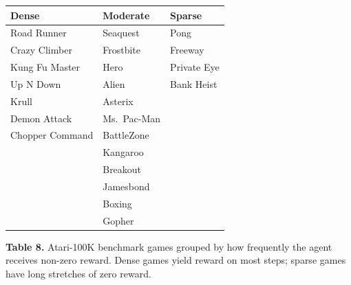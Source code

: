 \documentclass[11pt]{article}
\begin{document}
\vspace{0.3em}
\begin{table}[h]
\centering
\renewcommand{\arraystretch}{1.15}
\setlength{\tabcolsep}{14pt}
\begin{tabular}{l l l}
\toprule
\textbf{Dense} & \textbf{Moderate} & \textbf{Sparse} \\
\midrule
Road Runner     & Seaquest    & Pong        \\
Crazy Climber   & Frostbite   & Freeway     \\
Kung Fu Master  & Hero        & Private Eye \\
Up N Down       & Alien       & Bank Heist  \\
Krull           & Asterix     &             \\
Demon Attack    & Ms.\ Pac-Man &            \\
Chopper Command & BattleZone  &             \\
                & Kangaroo    &             \\
                & Breakout    &             \\
                & Jamesbond   &             \\
                & Boxing      &             \\
                & Gopher      &             \\
\bottomrule
\end{tabular}

\vspace{1.2em}
{\raggedright\small \textbf{Table 8.} Atari-100K benchmark games grouped by
how frequently the agent receives non-zero reward. Dense games yield
reward on most steps; sparse games have long stretches of zero reward.\par}
\end{table}
\end{document}
